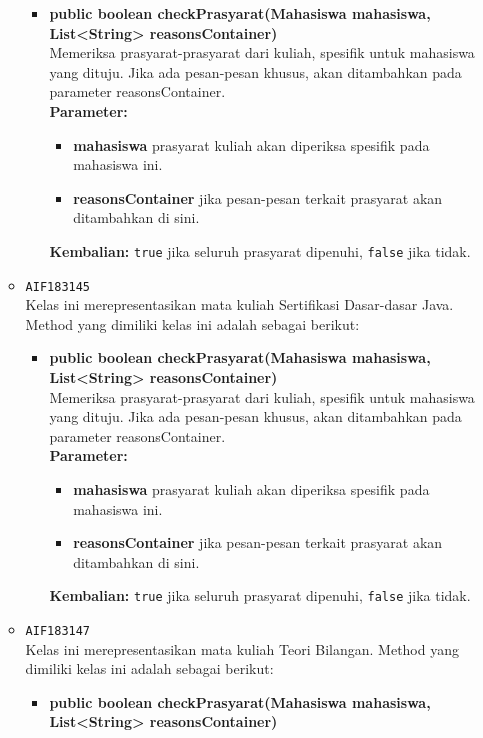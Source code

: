 \begin{enumerate}
\begin{itemize}
\begin{itemize}
\item \textbf{public boolean checkPrasyarat(Mahasiswa mahasiswa, List<String> reasonsContainer)}\\
Memeriksa prasyarat-prasyarat dari kuliah, spesifik untuk mahasiswa yang dituju. Jika ada pesan-pesan khusus, akan ditambahkan pada parameter reasonsContainer.\\
\textbf{Parameter:}
\begin{itemize}
\item \textbf{mahasiswa} prasyarat kuliah akan diperiksa spesifik pada mahasiswa ini.
\item \textbf{reasonsContainer} jika pesan-pesan terkait prasyarat akan ditambahkan di sini.
\end{itemize}
\textbf{Kembalian:} \texttt{true} jika seluruh prasyarat dipenuhi, \texttt{false} jika tidak.
\end{itemize}
\item \texttt{AIF183145} \\
Kelas ini merepresentasikan mata kuliah Sertifikasi Dasar-dasar Java. Method yang dimiliki kelas ini adalah sebagai berikut: 
\begin{itemize}
\item \textbf{public boolean checkPrasyarat(Mahasiswa mahasiswa, List<String> reasonsContainer)}\\
Memeriksa prasyarat-prasyarat dari kuliah, spesifik untuk mahasiswa yang dituju. Jika ada pesan-pesan khusus, akan ditambahkan pada parameter reasonsContainer.\\
\textbf{Parameter:}
\begin{itemize}
\item \textbf{mahasiswa} prasyarat kuliah akan diperiksa spesifik pada mahasiswa ini.
\item \textbf{reasonsContainer} jika pesan-pesan terkait prasyarat akan ditambahkan di sini.
\end{itemize}
\textbf{Kembalian:} \texttt{true} jika seluruh prasyarat dipenuhi, \texttt{false} jika tidak.
\end{itemize}
\item \texttt{AIF183147} \\
Kelas ini merepresentasikan mata kuliah Teori Bilangan. Method yang dimiliki kelas ini adalah sebagai berikut: 
\begin{itemize}
\item \textbf{public boolean checkPrasyarat(Mahasiswa mahasiswa, List<String> reasonsContainer)}\\

\end{itemize}
\end{itemize}
\end{enumerate}
